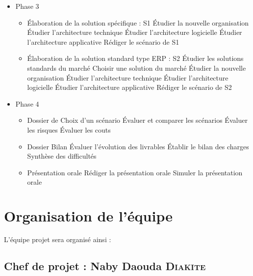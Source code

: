 \begin{itemize}
\begin{itemize}
        \item Phase 3
        \begin{itemize}
            \item Élaboration de la solution spécifique : S1
                \subitem Étudier la nouvelle organisation
                \subitem Étudier l’architecture technique
                \subitem Étudier l’architecture logicielle
                \subitem Étudier l’architecture applicative
                \subitem Rédiger le scénario de S1
            \item Élaboration de la solution standard type ERP : S2
                \subitem Étudier les solutions standards du marché
                \subitem Choisir une solution du marché
                \subitem Étudier la nouvelle organisation
                \subitem Étudier l’architecture technique
                \subitem Étudier l’architecture logicielle
                \subitem Étudier l’architecture applicative
                \subitem Rédiger le scénario de S2
        \end{itemize}

        \item Phase 4
        \begin{itemize}
            \item Dossier de Choix d’un scénario
                \subitem Évaluer et comparer les scénarios
                \subitem Évaluer les risques
                \subitem Évaluer les couts
            \item Dossier Bilan
                \subitem Évaluer l’évolution des livrables
                \subitem Établir le bilan des charges
                \subitem Synthèse des difficultés
            \item Présentation orale
                \subitem Rédiger la présentation orale
                \subitem Simuler la présentation orale
        \end{itemize}
    \end{itemize}
\end{itemize}
\section{Organisation de l'équipe}

L’équipe projet sera organisé ainsi :
\subsection{Chef de projet : Naby Daouda \textsc{Diakite}}

